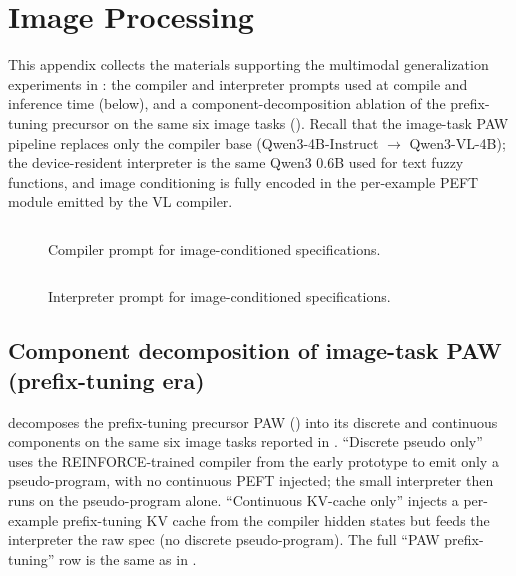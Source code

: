 \section{Image Processing}
\label{appendix:paw_image_prompts}

This appendix collects the materials supporting the multimodal generalization experiments in : the compiler and interpreter prompts used at compile and inference time (below), and a component-decomposition ablation of the prefix-tuning precursor on the same six image tasks (). Recall that the image-task PAW pipeline replaces only the compiler base (Qwen3-4B-Instruct $\to$ Qwen3-VL-4B); the device-resident interpreter is the same Qwen3 0.6B used for text fuzzy functions, and image conditioning is fully encoded in the per-example PEFT module emitted by the VL compiler.

\begin{figure}[!h]
    \centering
   \begin{tcolorbox}[colframe=borderblue, colback=bggray, left=1mm, right=1mm, top=0.5mm, bottom=0.5mm]
\inputminted[fontsize=\scriptsize, breaklines, breakanywhere, breaksymbolleft={}]{markdown}{figures/prompts/prompt_paw_compiler_vl.md}
\end{tcolorbox}
     \caption{\label{fig:prompt_paw_compiler_vl}Compiler prompt for image-conditioned specifications.}
\end{figure}

\begin{figure}[!h]
    \centering
   \begin{tcolorbox}[colframe=borderblue, colback=bggray, left=1mm, right=1mm, top=0.5mm, bottom=0.5mm]
\inputminted[fontsize=\scriptsize, breaklines, breakanywhere, breaksymbolleft={}]{markdown}{figures/prompts/prompt_paw_interpreter_vl.md}
\end{tcolorbox}
     \caption{\label{fig:prompt_paw_interpreter_vl}Interpreter prompt for image-conditioned specifications.}
\end{figure}

\subsection{Component decomposition of image-task PAW (prefix-tuning era)}
\label{appendix:image_ablations}

 decomposes the prefix-tuning precursor PAW () into its discrete and continuous components on the same six image tasks reported in . ``Discrete pseudo only'' uses the REINFORCE-trained compiler from the early prototype to emit only a pseudo-program, with no continuous PEFT injected; the small interpreter then runs on the pseudo-program alone. ``Continuous KV-cache only'' injects a per-example prefix-tuning KV cache from the compiler hidden states but feeds the interpreter the raw spec (no discrete pseudo-program). The full ``PAW prefix-tuning'' row is the same as in .

